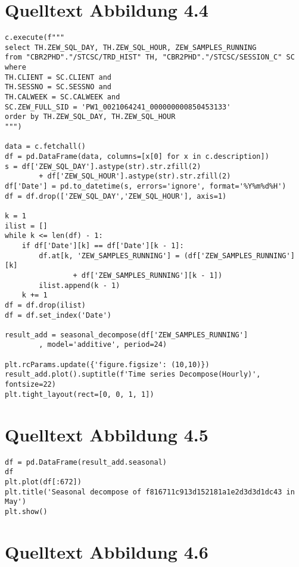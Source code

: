 \section{Quelltext Abbildung 4.4}

\begin{lstlisting}[caption={\texttt{Quelltext Abbildung 4.4}},captionpos=b]
c.execute(f"""
select TH.ZEW_SQL_DAY, TH.ZEW_SQL_HOUR, ZEW_SAMPLES_RUNNING
from "CBR2PHD"."/STCSC/TRD_HIST" TH, "CBR2PHD"."/STCSC/SESSION_C" SC
where
TH.CLIENT = SC.CLIENT and
TH.SESSNO = SC.SESSNO and
TH.CALWEEK = SC.CALWEEK and
SC.ZEW_FULL_SID = 'PW1_0021064241_000000000850453133'
order by TH.ZEW_SQL_DAY, TH.ZEW_SQL_HOUR
""")

data = c.fetchall()
df = pd.DataFrame(data, columns=[x[0] for x in c.description])
s = df['ZEW_SQL_DAY'].astype(str).str.zfill(2) 
		+ df['ZEW_SQL_HOUR'].astype(str).str.zfill(2)
df['Date'] = pd.to_datetime(s, errors='ignore', format='%Y%m%d%H')
df = df.drop(['ZEW_SQL_DAY','ZEW_SQL_HOUR'], axis=1)

k = 1
ilist = []
while k <= len(df) - 1:
	if df['Date'][k] == df['Date'][k - 1]:
		df.at[k, 'ZEW_SAMPLES_RUNNING'] = (df['ZEW_SAMPLES_RUNNING'][k] 
				+ df['ZEW_SAMPLES_RUNNING'][k - 1])
		ilist.append(k - 1)
	k += 1
df = df.drop(ilist)
df = df.set_index('Date')

result_add = seasonal_decompose(df['ZEW_SAMPLES_RUNNING']
		, model='additive', period=24)

plt.rcParams.update({'figure.figsize': (10,10)})
result_add.plot().suptitle(f'Time series Decompose(Hourly)', fontsize=22)
plt.tight_layout(rect=[0, 0, 1, 1])
\end{lstlisting}

\section{Quelltext Abbildung 4.5}

\begin{lstlisting}[caption={\texttt{Quelltext Abbildung 4.5}},captionpos=b]
df = pd.DataFrame(result_add.seasonal)
df
plt.plot(df[:672])
plt.title('Seasonal decompose of f816711c913d152181a1e2d3d3d1dc43 in May')
plt.show()
\end{lstlisting}

\section{Quelltext Abbildung 4.6}

